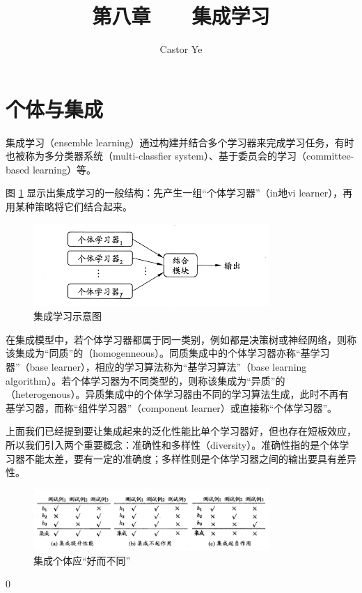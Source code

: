 \documentclass[12pt, a4paper]{article} %
\title{第八章 \ \ \ 集成学习} %
\author{Castor Ye} %
\date{} %
\begin{document}
\maketitle %
\newtheorem{definition}{定义}[section]
\newtheorem{theorem}{定理}[section]
\newtheorem{example}{例}[section]
\newtheorem{solution}{题解}
\newtheorem{algorithm}{算法}
\newtheorem{axiom}{公理}
\newtheorem{property}{性质}
\newtheorem{proposition}{命题}
\newtheorem{lemma}{引理}
\newtheorem{corollary}{推论}[section]
\newtheorem{remark}{注解}
\newtheorem{condition}{条件}
\newtheorem{conclusion}{结论}
\newtheorem{assumption}{假设}
\renewcommand{\figurename}{图} %
\renewcommand{\tablename}{表} %
\section{个体与集成}

集成学习（ensemble learning）通过构建并结合多个学习器来完成学习任务，有时也被称为多分类器系统（multi-classfier system）、基于委员会的学习（committee-based learning）等。

图 \ref{fig:集成学习示意图} 显示出集成学习的一般结构：先产生一组“个体学习器”（in地vi learner），再用某种策略将它们结合起来。

\begin{figure}[H]
    \centering
    \includegraphics[width=0.8\textwidth]{../img/8-1-集成学习示意图.png}
    \caption{集成学习示意图}
    \label{fig:集成学习示意图}
\end{figure}

在集成模型中，若个体学习器都属于同一类别，例如都是决策树或神经网络，则称该集成为“同质”的（homogenneous）。同质集成中的个体学习器亦称“基学习器”（base learner），相应的学习算法称为“基学习算法”（base learning algorithm）。若个体学习器为不同类型的，则称该集成为“异质”的（heterogenous）。异质集成中的个体学习器由不同的学习算法生成，此时不再有基学习器，而称“组件学习器”（component learner）或直接称“个体学习器”。

上面我们已经提到要让集成起来的泛化性能比单个学习器好，但也存在短板效应，所以我们引入两个重要概念：准确性和多样性（diversity）。准确性指的是个体学习器不能太差，要有一定的准确度；多样性则是个体学习器之间的输出要具有差异性。

\begin{figure}[H]
    \centering
    \includegraphics[width=0.8\textwidth]{../img/8-2-集成个体应“好而不同”.png}
    \caption{集成个体应“好而不同”}
    \label{fig:集成个体应“好而不同”}
\end{figure}

0
\end{document}
